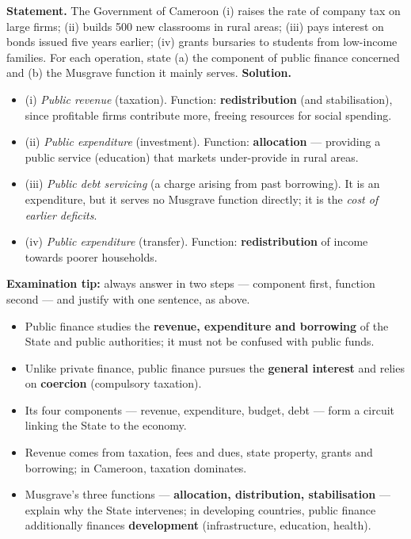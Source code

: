 \documentclass[11pt]{article}
\begin{document}
\begin{exoresolu}
\textbf{Statement.} The Government of Cameroon (i) raises the rate of company tax on large firms; (ii) builds 500 new classrooms in rural areas; (iii) pays interest on bonds issued five years earlier; (iv) grants bursaries to students from low-income families. For each operation, state (a) the component of public finance concerned and (b) the Musgrave function it mainly serves.
\tcblower
\textbf{Solution.}
\begin{itemize}
\item (i) \emph{Public revenue} (taxation). Function: \textbf{redistribution} (and stabilisation), since profitable firms contribute more, freeing resources for social spending.
\item (ii) \emph{Public expenditure} (investment). Function: \textbf{allocation} --- providing a public service (education) that markets under-provide in rural areas.
\item (iii) \emph{Public debt servicing} (a charge arising from past borrowing). It is an expenditure, but it serves no Musgrave function directly; it is the \emph{cost of earlier deficits}.
\item (iv) \emph{Public expenditure} (transfer). Function: \textbf{redistribution} of income towards poorer households.
\end{itemize}
\textbf{Examination tip:} always answer in two steps --- component first, function second --- and justify with one sentence, as above.
\end{exoresolu}

\begin{aretenir}
\begin{itemize}
\item Public finance studies the \textbf{revenue, expenditure and borrowing} of the State and public authorities; it must not be confused with public funds.
\item Unlike private finance, public finance pursues the \textbf{general interest} and relies on \textbf{coercion} (compulsory taxation).
\item Its four components --- revenue, expenditure, budget, debt --- form a circuit linking the State to the economy.
\item Revenue comes from taxation, fees and dues, state property, grants and borrowing; in Cameroon, taxation dominates.
\item Musgrave's three functions --- \textbf{allocation, distribution, stabilisation} --- explain why the State intervenes; in developing countries, public finance additionally finances \textbf{development} (infrastructure, education, health).
\end{itemize}
\end{aretenir}
\end{document}
